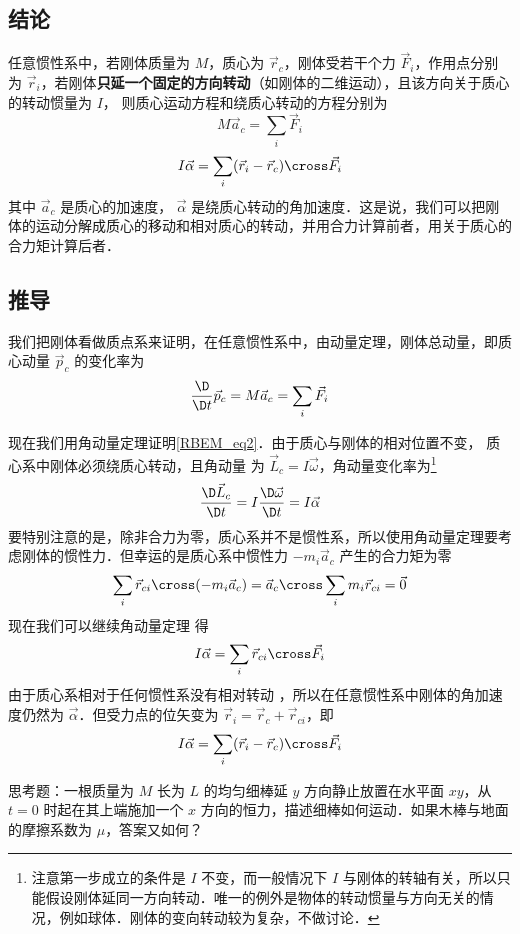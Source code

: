 

\subsection{结论}
任意惯性系中，若刚体质量为 $M$，质心为 $\vec r_c$，刚体受若干个力 $\vec F_i$，作用点分别为 $\vec r_i$，若刚体\textbf{只延一个固定的方向转动}（如刚体的二维运动），且该方向关于质心的转动惯量为 $I$， 则质心运动方程和绕质心转动的方程分别为
\begin{equation}\label{RBEM_eq1}
M\vec a_c = \sum_i \vec F_i
\end{equation}
\begin{equation}\label{RBEM_eq2}
I \vec \alpha = \sum_i (\vec r_i-\vec r_c) \cross  \vec F_i
\end{equation}
其中 $\vec a_c$ 是质心的加速度， $\vec \alpha$ 是绕质心转动的角加速度．这是说，我们可以把刚体的运动分解成质心的移动和相对质心的转动，并用合力计算前者，用关于质心的合力矩计算后者．

\subsection{推导}
我们把刚体看做质点系来证明，在任意惯性系中，由动量定理，刚体总动量，即质心动量 $\vec p_c$ 的变化率为
\begin{equation}
\frac{\D}{\D t}\vec p_c = M \vec a_c = \sum_i \vec F_i
\end{equation}

现在我们用角动量定理证明\autoref{RBEM_eq2}．由于质心与刚体的相对位置不变，%
质心系中刚体必须绕质心转动，且角动量%
为 $\vec L_c = I \vec\omega$，角动量变化率为\footnote{注意第一步成立的条件是 $I$ 不变，而一般情况下 $I$ 与刚体的转轴有关，所以只能假设刚体延同一方向转动．唯一的例外是物体的转动惯量与方向无关的情况，例如球体．刚体的变向转动较为复杂，不做讨论．}
\begin{equation}
\frac{\D \vec L_c}{\D t} = I \frac{\D\vec \omega}{\D t} = I \vec\alpha
\end{equation}
要特别注意的是，除非合力为零，质心系并不是惯性系，所以使用角动量定理要考虑刚体的惯性力．但幸运的是质心系中惯性力%
 $-m_i \vec a_c$ 产生的合力矩为零%
\begin{equation}
\sum_i \vec r_{ci}\cross (-m_i \vec a_{c}) = \vec a_{c} \cross \sum_i m_i \vec r_{ci} = \vec 0
\end{equation}
现在我们可以继续角动量定理 得
\begin{equation}
I \vec\alpha = \sum_i \vec r_{ci} \cross  \vec F_i
\end{equation}
由于质心系相对于任何惯性系没有相对转动%
，所以在任意惯性系中刚体的角加速度仍然为 $\vec\alpha$．但受力点的位矢变为 $\vec r_i = \vec r_c + \vec r_{ci}$，即
\begin{equation}\label{RBEM_eq7}
I \vec \alpha = \sum_i (\vec r_i-\vec r_c) \cross  \vec F_i
\end{equation}


思考题：一根质量为 $M$ 长为 $L$ 的均匀细棒延 $y$ 方向静止放置在水平面 $xy$，从 $t=0$ 时起在其上端施加一个 $x$ 方向的恒力，描述细棒如何运动．如果木棒与地面的摩擦系数为 $\mu$，答案又如何？

